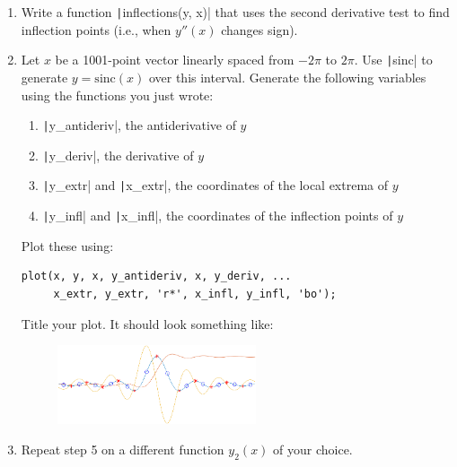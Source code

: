 \documentclass{article}
\begin{document}
\begin{description}
\begin{enumerate}
  \item Write a function \texttt|inflections(y, x)| that uses the second derivative test to find inflection points (i.e., when $y''(x)$ changes sign).
    
  \item Let $x$ be a 1001-point vector linearly spaced from $-2\pi$ to $2\pi$. Use \texttt|sinc| to generate $y=\text{sinc}(x)$ over this interval. Generate the following variables using the functions you just wrote:
    \begin{enumerate}
    \item \texttt|y_antideriv|, the antiderivative of $y$
    \item \texttt|y_deriv|, the derivative of $y$
    \item \texttt|y_extr| and \texttt|x_extr|, the coordinates of the local extrema of $y$
    \item \texttt|y_infl| and \texttt|x_infl|, the coordinates of the inflection points of $y$
    \end{enumerate}
    Plot these using: \begin{verbatim}
plot(x, y, x, y_antideriv, x, y_deriv, ...
     x_extr, y_extr, 'r*', x_infl, y_infl, 'bo');
\end{verbatim}
    Title your plot. It should look something like:
    \begin{figure}[!h]
      \centering
      \includegraphics[width=2.3in]{result.png}
    \end{figure}
  \item Repeat step 5 on a different function $y_2(x)$ of your choice.
  \end{enumerate}
\end{description}
\end{document}
